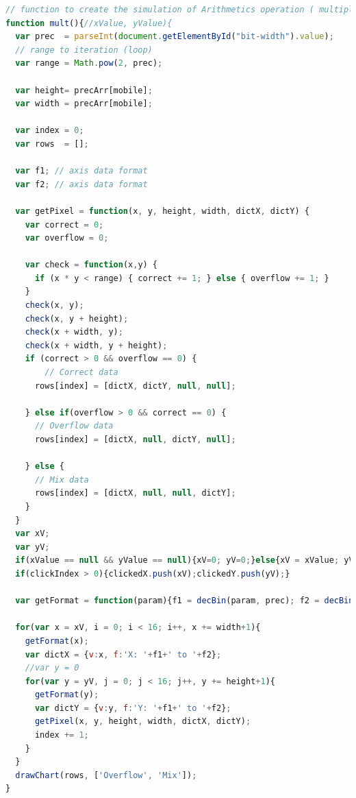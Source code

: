 \documentclass[11pt]{article}
\begin{document}
\begin{lstlisting}[label={lst:mult}, language=Javascript, caption={mult function},]
// function to create the simulation of Arithmetics operation ( multiplication )
function mult(){//xValue, yValue){
  var prec  = parseInt(document.getElementById("bit-width").value);
  // range to iteration (loop)
  var range = Math.pow(2, prec);

  var height= precArr[mobile];
  var width = precArr[mobile];

  var index = 0;
  var rows  = [];

  var f1; // axis data format 
  var f2; // axis data format

  var getPixel = function(x, y, height, width, dictX, dictY) {
    var correct = 0;
    var overflow = 0;

    var check = function(x,y) {
      if (x * y < range) { correct += 1; } else { overflow += 1; }  
    }
    check(x, y);
    check(x, y + height);
    check(x + width, y);
    check(x + width, y + height);
    if (correct > 0 && overflow == 0) {
        // Correct data
      rows[index] = [dictX, dictY, null, null];

    } else if(overflow > 0 && correct == 0) {
      // Overflow data
      rows[index] = [dictX, null, dictY, null];

    } else {
      // Mix data
      rows[index] = [dictX, null, null, dictY];
    }
  }
  var xV;
  var yV; 
  if(xValue == null && yValue == null){xV=0; yV=0;}else{xV = xValue; yV = yValue;}
  if(clickIndex > 0){clickedX.push(xV);clickedY.push(yV);}
  
  var getFormat = function(param){f1 = decBin(param, prec); f2 = decBin(param+height, prec);}
  
  for(var x = xV, i = 0; i < 16; i++, x += width+1){
    getFormat(x);
    var dictX = {v:x, f:'X: '+f1+' to '+f2};
    //var y = 0
    for(var y = yV, j = 0; j < 16; j++, y += height+1){
      getFormat(y);
      var dictY = {v:y, f:'Y: '+f1+' to '+f2};
      getPixel(x, y, height, width, dictX, dictY);
      index += 1;
    }
  }
  drawChart(rows, ['Overflow', 'Mix']);
}

\end{lstlisting}
\end{document}
